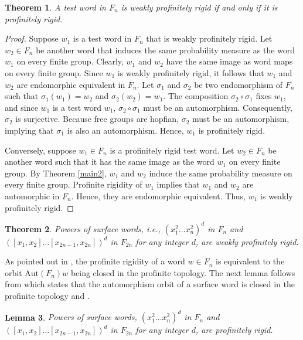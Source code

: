 \documentclass[12pt]{amsart}
\newtheorem{theorem}{Theorem}[section]
\newtheorem{lemma}[theorem]{Lemma}
\begin{document}
\begin{theorem}\label{theorem}
     A test word in $F_n$ is weakly profinitely rigid if and only if it is profinitely rigid. 
\end{theorem}
\begin{proof}
    Suppose $w_1$ is a test word in $F_n$ that is weakly profinitely rigid. Let $w_2 \in F_n$ be another word that induces the same probability measure as the word $w_1$ on every finite group. Clearly, $w_1$ and $w_2$ have the same image as word maps on every finite group. Since $w_1$ is weakly profinitely rigid, it follows that $w_1$ and $w_2$ are endomorphic equivalent in $F_n$. Let $\sigma_1$ and $\sigma_2$ be two endomorphism of $F_n$ such that $\sigma_1(w_1) = w_2$ and $\sigma_2(w_2) = w_1$. The composition $\sigma_2 \circ \sigma_1$ fixes $w_1$, and since $w_1$ is a test word $w_1$, $\sigma_2 \circ \sigma_1$ must be an automorphism. Consequently, $\sigma_2$ is surjective. Because free groups are hopfian, $\sigma_2$ must be an automorphism, implying that $\sigma_1$ is also an automorphism.  Hence, $w_1$ is profinitely rigid. 

    Conversely, suppose $w_1 \in F_n$ is a profinitely rigid test word. Let $w_2 \in F_n$ be another word such that it has the same image as the word $w_1$ on every finite group. By Theorem \ref{main2}, $w_1$ and $w_2$ induce the same probability measure on every finite group. Profinite rigidity of $w_1$ implies that $w_1$ and $w_2$ are automorphic in $F_n$. Hence, they are endomorphic equivalent. Thus, $w_1$ is weakly profinitely rigid. 
\end{proof}

\begin{theorem}\label{thm}
    Powers of surface words, i.e., $(x_1^2\ldots x_n^2)^d$ in $F_n$ and $([x_1,x_2]\ldots [x_{2n-1},x_{2n}])^d$ in $F_{2n}$ for any integer $d$, are weakly profinitely rigid.
\end{theorem}

As pointed out in \cite[pp.~ 93-94]{puder2015measure}, the profinite rigidity of a word $w \in F_n $ is equivalent to the orbit $\mathrm{Aut}(F_n)w$ being closed in the profinite topology. The next lemma follows from \cite[Corollary~4]{wilton2021profinite} which states that the automorphism orbit of a surface word is closed in the profinite topology and \cite[Remark~6]{wilton2021profinite}.


\begin{lemma}\cite{wilton2021profinite}\label{lem1}
   Powers of surface words, $(x_1^2\ldots x_n^2)^d$ in $F_n$ and $([x_1,x_2]\ldots [x_{2n-1},x_{2n}])^d$ in $F_{2n}$ for any integer $d$, are profinitely rigid.
\end{lemma}
\end{document}
